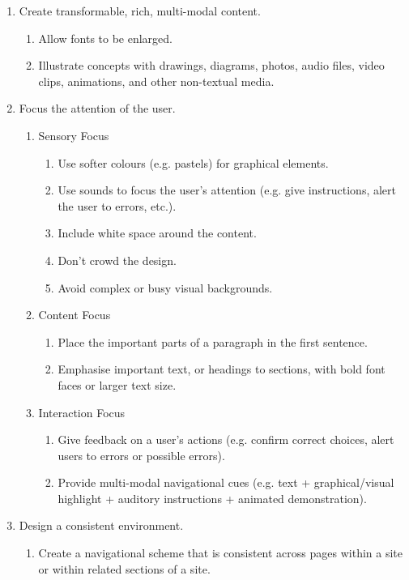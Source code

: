 \begin{enumerate}
	\item Create transformable, rich, multi-modal content.
	\begin{enumerate}
			\item Allow fonts to be enlarged.
			\item Illustrate concepts with drawings, diagrams, photos, audio files, video clips, animations, and other non-textual media.
	\end{enumerate}

	\item Focus the attention of the user.
	\begin{enumerate}
		\item Sensory Focus
			\begin{enumerate}
				\item Use softer colours (e.g. pastels) for graphical elements.
				\item Use sounds to focus the user's attention (e.g. give instructions, alert the user to errors, etc.).
				\item Include white space around the content.
				\item Don't crowd the design.
				\item Avoid complex or busy visual backgrounds.
			\end{enumerate}

		\item Content Focus
		\begin{enumerate}
			\item Place the important parts of a paragraph in the first sentence.
			\item Emphasise important text, or headings to sections, with bold font faces or larger text size.
		 	\end{enumerate}

	 	\item Interaction Focus
		\begin{enumerate}
			\item Give feedback on a user's actions (e.g. confirm correct choices, alert users to errors or possible errors).
			\item Provide multi-modal navigational cues (e.g. text + graphical/visual highlight + auditory instructions + animated demonstration).
	 	\end{enumerate}
 	\end{enumerate}

	 	\item Design a consistent environment.
		\begin{enumerate}
		\item Create a navigational scheme that is consistent across pages within a site or within related sections of a site.
 	\end{enumerate}


\end{enumerate}
